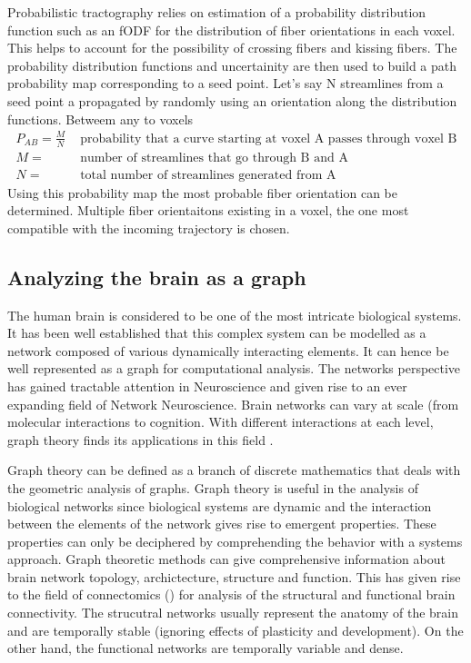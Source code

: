 \documentclass[msthesis.tex]{subfiles}
\begin{document}
Probabilistic tractography relies on estimation of a probability distribution function such as an fODF for the distribution of fiber orientations in each voxel. This helps to account for the possibility of crossing fibers and kissing fibers. The probability distribution functions and uncertainity are then used to build a path probability map corresponding to a seed point. Let's say N streamlines from a seed point a propagated by randomly using an orientation along the distribution functions. Betweem any to voxels 
\begin{align*}
P_{AB}= \frac{M}{N} & \textrm{ probability that a curve starting at voxel A passes through voxel B} \\
M = & \textrm{ number of streamlines that go through B and A} \\
N = &\textrm{ total number of streamlines generated from A}
\end{align*}
Using this probability map the most probable fiber orientation can be determined. Multiple fiber orientaitons existing in a voxel, the one most compatible with the incoming trajectory is chosen\citep{behrens2003non}.
\subsection{Analyzing the brain as a graph}
\label{sec:braingraph}
The human brain is considered to be one of the most intricate biological systems. It has been well established that this complex system can be modelled as a network composed of various dynamically interacting elements. It can hence be well represented as a graph for computational analysis. The networks perspective has gained tractable attention in Neuroscience and given rise to an ever expanding field of Network Neuroscience. Brain networks can vary at scale (from molecular interactions to cognition. With different interactions at each level, graph theory finds its applications in this field \cite{sporns2018graph}. 

Graph theory can be defined as a branch of discrete mathematics that deals with the geometric analysis of graphs. Graph theory is useful in the analysis of biological networks since biological systems are dynamic and the interaction between the elements of the network gives rise to emergent properties. These properties can only be deciphered by comprehending the behavior with a systems approach. Graph theoretic methods can give comprehensive information about brain network topology, archictecture, structure and function. This has given rise to the field of connectomics (\citep{sporns2005human}) for analysis of the structural and functional brain connectivity. The strucutral networks usually represent the anatomy of the brain and are temporally stable (ignoring effects of plasticity and development). On the other hand, the functional networks are temporally variable and dense.
\end{document}
